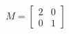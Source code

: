 \documentclass[preview]{standalone}
\begin{document}
\begin{align*}
M = \begin{bmatrix} 2 & 0 \\ 0 & 1 \end{bmatrix}
\end{align*}
\end{document}

